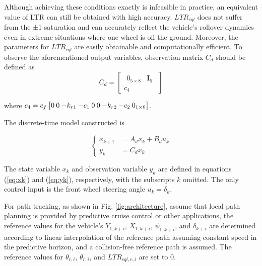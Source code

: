 Although achieving these conditions exactly is infeasible in practice, an equivalent value of LTR can still be obtained with high accuracy. $LTR_{eql}$ does not suffer from the ±1 saturation and can accurately reflect the vehicle's rollover dynamics even in extreme situations where one wheel is off the ground. Moreover, the parameters for $LTR_{eql}$ are easily obtainable and computationally efficient. To observe the aforementioned output variables, observation matrix $C_d$ should be defined as
\vspace{-0.2cm}
\begin{equation}
C_{d} = \begin{bmatrix}
\begin{matrix}
0_{5 \times 8} & \mathbf{I}_{5}
\end{matrix} \\
c_{4}
\end{bmatrix}
\end{equation}

where $
\setlength{\arraycolsep}{1.2pt}
c_{4} = c_{f}\begin{bmatrix}
0 & 0 & {- k_{r1}} & {- c_{1}} & 0 & 0 & {- k_{r2}} & {- c_{2}} & 0_{1 \times 6}
\end{bmatrix}\nonumber
$.

The discrete-time model constructed is

\begin{equation}
\left\{
\begin{aligned}
x_{k+1} &= A_d x_k + B_d u_k \\
y_k &= C_d x_k
\end{aligned}
\right.
\end{equation}

The state variable $x_k$ and observation variable $y_k$ are defined in equations (\ref{eq:xk}) and (\ref{eq:yk}), respectively, with the subscripts $k$ omitted. The only control input is the front wheel steering angle $u_k = \delta_k$. 

For path tracking, as shown in Fig. \ref{fig:architecture}, assume that local path planning is provided by predictive cruise control or other applications, the reference values for the vehicle's $Y_{1,k+i}$, $X_{1,k+i}$, $\psi_{1,k+i}$, and $\delta_{k+i}$ are determined according to linear interpolation of the reference path assuming constant speed in the predictive horizon, and a collision-free reference path is assumed. The reference values for $\theta_{r,i}$, $\dot{\theta}_{r,i}$, and $LTR_{eql,r,i}$ are set to 0. 

